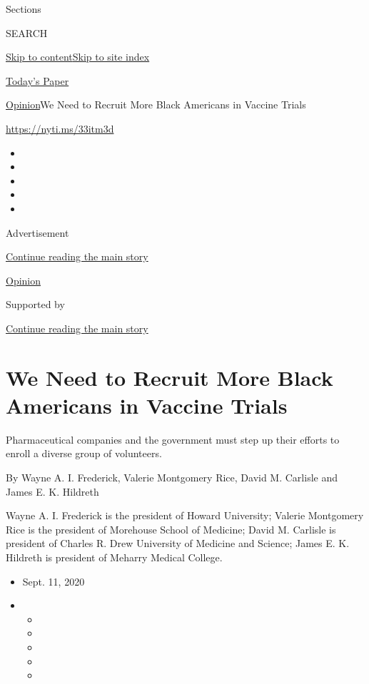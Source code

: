 Sections

SEARCH

\protect\hyperlink{site-content}{Skip to
content}\protect\hyperlink{site-index}{Skip to site index}

\href{https://myaccount.nytimes3xbfgragh.onion/auth/login?response_type=cookie\&client_id=vi}{}

\href{https://www.nytimes3xbfgragh.onion/section/todayspaper}{Today's
Paper}

\href{/section/opinion}{Opinion}\textbar{}We Need to Recruit More Black
Americans in Vaccine Trials

\url{https://nyti.ms/33itm3d}

\begin{itemize}
\item
\item
\item
\item
\item
\end{itemize}

Advertisement

\protect\hyperlink{after-top}{Continue reading the main story}

\href{/section/opinion}{Opinion}

Supported by

\protect\hyperlink{after-sponsor}{Continue reading the main story}

\hypertarget{we-need-to-recruit-more-black-americans-in-vaccine-trials}{%
\section{We Need to Recruit More Black Americans in Vaccine
Trials}\label{we-need-to-recruit-more-black-americans-in-vaccine-trials}}

Pharmaceutical companies and the government must step up their efforts
to enroll a diverse group of volunteers.

By Wayne A. I. Frederick, Valerie Montgomery Rice, David M. Carlisle and
James E. K. Hildreth

Wayne A. I. Frederick is the president of Howard University; Valerie
Montgomery Rice is the president of Morehouse School of Medicine; David
M. Carlisle is president of Charles R. Drew University of Medicine and
Science; James E. K. Hildreth is president of Meharry Medical College.

\begin{itemize}
\item
  Sept. 11, 2020
\item
  \begin{itemize}
  \item
  \item
  \item
  \item
  \item
  \end{itemize}
\end{itemize}


